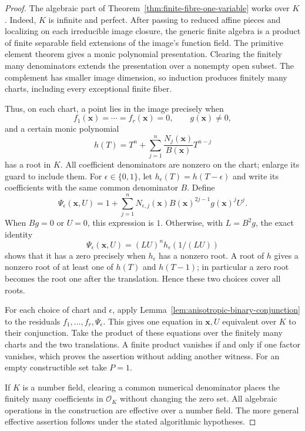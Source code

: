 \documentclass[11pt]{article}
\theoremstyle{definition}
\begin{document}
\begin{proof}
The algebraic part of Theorem~\ref{thm:finite-fibre-one-variable} works
over $K$. Indeed, $K$ is infinite and perfect. After passing to reduced
affine pieces and localizing on each irreducible image closure, the
generic finite algebra is a product of finite separable field extensions
of the image's function field. The primitive element theorem gives
a monic polynomial presentation. Clearing the finitely many
denominators extends the presentation over a nonempty open subset.
The complement has smaller image dimension, so induction produces
finitely many charts, including every exceptional finite fiber.

Thus, on each chart, a point lies in the image precisely when
\[
 f_1(\mathbf x)=\cdots=f_r(\mathbf x)=0,
 \qquad g(\mathbf x)\ne0,
\]
and a certain monic polynomial
\[
 h(T)=T^n+\sum_{j=1}^n\frac{N_j(\mathbf x)}{B(\mathbf x)}T^{n-j}
\]
has a root in $K$. All coefficient denominators are nonzero on the
chart; enlarge its guard to include them. For $\epsilon\in\{0,1\}$,
let $h_\epsilon(T)=h(T-\epsilon)$ and write its coefficients with
the same common denominator $B$. Define
\[
 \Psi_\epsilon(\mathbf x,U)
 =1+\sum_{j=1}^n
      N_{\epsilon,j}(\mathbf x)
      B(\mathbf x)^{2j-1}g(\mathbf x)^jU^j.
\]
When $Bg=0$ or $U=0$, this expression is $1$. Otherwise, with
$L=B^2g$, the exact identity
\[
 \Psi_\epsilon(\mathbf x,U)
   =(LU)^n h_\epsilon(1/(LU))
\]
shows that it has a zero precisely when $h_\epsilon$ has a nonzero
root. A root of $h$ gives a nonzero root of at least one of $h(T)$
and $h(T-1)$; in particular a zero root becomes the root one after
the translation. Hence these two choices cover all roots.

For each choice of chart and $\epsilon$, apply
Lemma~\ref{lem:anisotropic-binary-conjunction} to the residuals
$f_1,\ldots,f_r,\Psi_\epsilon$. This gives one equation in
$\mathbf x,U$ equivalent over $K$ to their conjunction. Take the
product of these equations over the finitely many charts and the
two translations. A finite product vanishes if and only if one
factor vanishes, which proves the assertion without adding another
witness. For an empty constructible set take $P=1$.

If $K$ is a number field, clearing a common numerical denominator
places the finitely many coefficients in $\mathcal O_K$ without
changing the zero set. All algebraic operations in the construction
are effective over a number field. The more general effective
assertion follows under the stated algorithmic hypotheses.
\end{proof}
\end{document}

